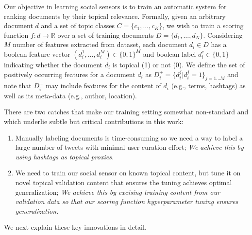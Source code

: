 Our objective in learning social sensors is to train an automatic
system for ranking documents by their topical relevance.  Formally,
given an arbitrary document $d$ and a set of topic classes $C = \{
c_1,\ldots,c_K\}$, we wish to train a scoring function $f\!\!:\!\!d \rightarrow \mathbb{R}$
over a set of training documents $D = \{
d_1,\ldots,d_N \}$.
Considering $M$ number of features extracted from dataset, each document $d_i \in D$ has a boolean feature vector
$(d_i^1,\ldots,d_i^M) \in \{0,1\}^M$ and boolean label $d_i^c \in \{
0,1 \}$ indicating whether the document $d_i$ is topical (1) or not
(0).  We define the set of positively occurring features for a document
$d_i$ as $D_i^+ = \{ d_i^j | d_i^j=1 \}_{j=1\ldots M}$ and note that
$D_i^+$ may include features for the content of $d_i$ (e.g., terms, 
hashtags) as well as its meta-data (e.g., author, location).

There are two catches that make our training setting somewhat
non-standard and which underlie subtle but critical contributions in this
work:  
\begin{enumerate}
\item Manually labeling documents is time-consuming so
we need a way to label a large number of tweets with minimal
user curation effort; \emph{We achieve this by using hashtags as topical proxies.}
\item We need to train our social sensor on
known topical content, but tune it on novel topical validation content 
that ensures the tuning achieves optimal generalization; \emph{We achieve this by 
excising training content from our validation data so that our scoring
function hyperparameter tuning ensures generalization.}
\end{enumerate}
We next explain these key innovations in detail.

%
%

%
%

